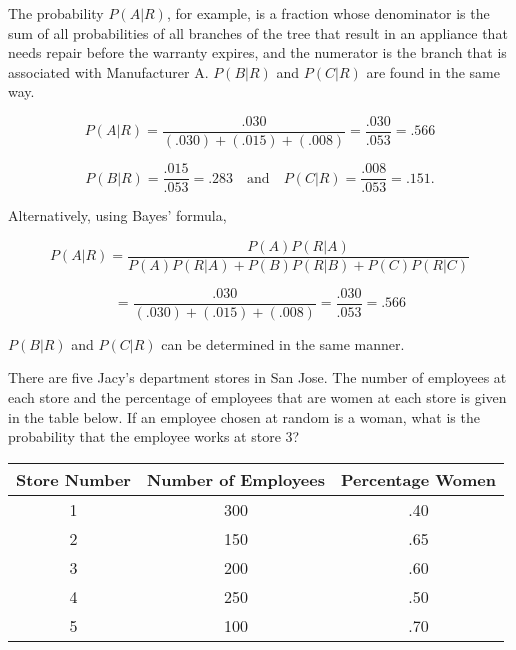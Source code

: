 \begin{solution}
    The probability $P(A | R)$, for example, is a fraction whose denominator is the sum of all probabilities of all branches of the tree that result in an appliance that needs repair before the warranty expires, and the numerator is the branch that is associated with Manufacturer A. $P(B | R)$ and $P(C | R)$ are found in the same way.

    \[
        P(A | R) = \frac{.030}{(.030) + (.015) + (.008)} = \frac{.030}{.053} = .566
    \]

    \[
        P(B | R) = \frac{.015}{.053} = .283 \quad \text{and} \quad P(C | R) = \frac{.008}{.053} = .151.
    \]

    Alternatively, using Bayes' formula,

    \[
        P(A | R) = \frac{P(A)P(R | A)}{P(A)P(R | A) + P(B)P(R | B) + P(C)P(R | C)}
    \]

    \[
        = \frac{.030}{(.030) + (.015) + (.008)} = \frac{.030}{.053} = .566
    \]

    $P(B | R)$ and $P(C | R)$ can be determined in the same manner.

\end{solution}

\begin{example}
    There are five Jacy's department stores in San Jose. The number of employees at each store and the percentage of employees that are women at each store is given in the table below. If an employee chosen at random is a woman, what is the probability that the employee works at store 3?
    \begin{center}
        \begin{tabular}{ccc}
            \hline
            Store Number & Number of Employees & Percentage Women \\
            \hline
            1            & 300                 & .40              \\
            2            & 150                 & .65              \\
            3            & 200                 & .60              \\
            4            & 250                 & .50              \\
            5            & 100                 & .70              \\
            \hline
        \end{tabular}
    \end{center}


\end{example}

